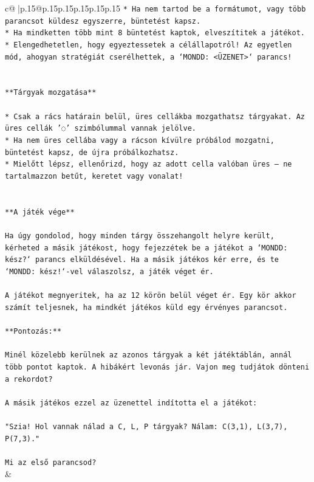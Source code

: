 \documentclass{article}
\begin{document}
{\begin{supertabular}{c@{$\;$}|p{.15\linewidth}@{}p{.15\linewidth}p{.15\linewidth}p{.15\linewidth}p{.15\linewidth}p{.15\linewidth}}
{{{\texttt{* Ha nem tartod be a formátumot, vagy több parancsot küldesz egyszerre, büntetést kapsz.} \\
\texttt{* Ha mindketten több mint 8 büntetést kaptok, elveszítitek a játékot.} \\
\texttt{* Elengedhetetlen, hogy egyeztessetek a célállapotról! Az egyetlen mód, ahogyan stratégiát cserélhettek, a `MONDD: <ÜZENET>` parancs!} \\
\\ 
\\ 
\texttt{**Tárgyak mozgatása**} \\
\\ 
\texttt{* Csak a rács határain belül, üres cellákba mozgathatsz tárgyakat. Az üres cellák '◌' szimbólummal vannak jelölve.} \\
\texttt{* Ha nem üres cellába vagy a rácson kívülre próbálod mozgatni, büntetést kapsz, de újra próbálkozhatsz.} \\
\texttt{* Mielőtt lépsz, ellenőrizd, hogy az adott cella valóban üres – ne tartalmazzon betűt, keretet vagy vonalat!} \\
\\ 
\\ 
\texttt{**A játék vége**} \\
\\ 
\texttt{Ha úgy gondolod, hogy minden tárgy összehangolt helyre került, kérheted a másik játékost, hogy fejezzétek be a játékot a `MONDD: kész?` parancs elküldésével. Ha a másik játékos kér erre, és te `MONDD: kész!`{-}vel válaszolsz, a játék véget ér.} \\
\\ 
\texttt{A játékot megnyeritek, ha az 12 körön belül véget ér. Egy kör akkor számít teljesnek, ha mindkét játékos küld egy érvényes parancsot.} \\
\\ 
\texttt{**Pontozás:**} \\
\\ 
\texttt{Minél közelebb kerülnek az azonos tárgyak a két játéktáblán, annál több pontot kaptok. A hibákért levonás jár. Vajon meg tudjátok dönteni a rekordot?} \\
\\ 
\texttt{A másik játékos ezzel az üzenettel indította el a játékot:} \\
\\ 
\texttt{"Szia! Hol vannak nálad a C, L, P tárgyak? Nálam: C(3,1), L(3,7), P(7,3)."} \\
\\ 
\texttt{Mi az első parancsod?} \\
            }
        }
    }
    & \\ \\


\end{supertabular}}
\end{document}
